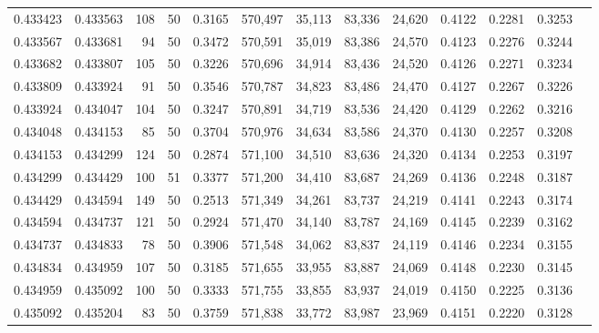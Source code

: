 \begin{tabular}{rrrrrrrrrrrrr}
0.433423 & 0.433563 &   108 &  50 &                                     0.3165 & 570,497 &  35,113 &  83,336 &  24,620 & 0.4122 & 0.2281 & 0.3253 \\
0.433567 & 0.433681 &    94 &  50 &                                     0.3472 & 570,591 &  35,019 &  83,386 &  24,570 & 0.4123 & 0.2276 & 0.3244 \\
0.433682 & 0.433807 &   105 &  50 &                                     0.3226 & 570,696 &  34,914 &  83,436 &  24,520 & 0.4126 & 0.2271 & 0.3234 \\
0.433809 & 0.433924 &    91 &  50 &                                     0.3546 & 570,787 &  34,823 &  83,486 &  24,470 & 0.4127 & 0.2267 & 0.3226 \\
0.433924 & 0.434047 &   104 &  50 &                                     0.3247 & 570,891 &  34,719 &  83,536 &  24,420 & 0.4129 & 0.2262 & 0.3216 \\
0.434048 & 0.434153 &    85 &  50 &                                     0.3704 & 570,976 &  34,634 &  83,586 &  24,370 & 0.4130 & 0.2257 & 0.3208 \\
0.434153 & 0.434299 &   124 &  50 &                                     0.2874 & 571,100 &  34,510 &  83,636 &  24,320 & 0.4134 & 0.2253 & 0.3197 \\
0.434299 & 0.434429 &   100 &  51 &                                     0.3377 & 571,200 &  34,410 &  83,687 &  24,269 & 0.4136 & 0.2248 & 0.3187 \\
0.434429 & 0.434594 &   149 &  50 &                                     0.2513 & 571,349 &  34,261 &  83,737 &  24,219 & 0.4141 & 0.2243 & 0.3174 \\
0.434594 & 0.434737 &   121 &  50 &                                     0.2924 & 571,470 &  34,140 &  83,787 &  24,169 & 0.4145 & 0.2239 & 0.3162 \\
0.434737 & 0.434833 &    78 &  50 &                                     0.3906 & 571,548 &  34,062 &  83,837 &  24,119 & 0.4146 & 0.2234 & 0.3155 \\
0.434834 & 0.434959 &   107 &  50 &                                     0.3185 & 571,655 &  33,955 &  83,887 &  24,069 & 0.4148 & 0.2230 & 0.3145 \\
0.434959 & 0.435092 &   100 &  50 &                                     0.3333 & 571,755 &  33,855 &  83,937 &  24,019 & 0.4150 & 0.2225 & 0.3136 \\
0.435092 & 0.435204 &    83 &  50 &                                     0.3759 & 571,838 &  33,772 &  83,987 &  23,969 & 0.4151 & 0.2220 & 0.3128 \\

\end{tabular}
